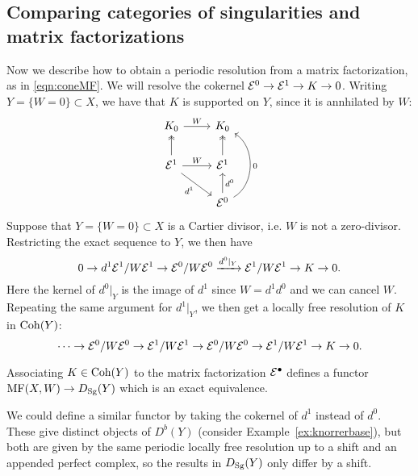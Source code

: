 \subsection{Comparing categories of singularities and matrix factorizations}

Now we describe how to obtain a periodic resolution from a matrix factorization,
as in \eqref{eqn:coneMF}. We will resolve the cokernel
$\mathcal{E}^0\to\mathcal{E}^1\to K\to0$. Writing $Y=\{W=0\}\subset X$, we have that $K$ is
supported on $Y$, since it is annhilated by $W$:
\begin{equation*}
    \begin{tikzcd}
        K_0 \ar[r,"W"] & K_0 \\
        \calE^1 \ar[r,"W"] \ar[dr,"d^1"'] \ar[u,two heads] &
        \calE^1 \ar[u,two heads] \\
        & \calE^0 \ar[u,"d^0"'] \ar[uu,bend right=60,"0"']
    \end{tikzcd}
\end{equation*}
Suppose that $Y=\{W=0\}\subset X$ is a Cartier divisor, i.e. $W$ is not a
zero-divisor. Restricting the exact sequence to $Y$, we then have
\begin{equation*}
    0 \to d^1\mathcal{E}^1/W\mathcal{E}^1
        \to \mathcal{E}^0/W\mathcal{E}^0 \xrightarrow{d^0|_Y} \mathcal{E}^1/W\mathcal{E}^1 \to K \to 0.
\end{equation*}
Here the kernel of $d^0|_Y$ is the image of $d^1$ since $W=d^1d^0$ and we can
cancel $W$. Repeating the same argument for $d^1|_Y$, we then get a locally free
resolution of $K$ in $\operatorname{Coh}(Y)$:
\begin{equation*}
    \cdots \to \mathcal{E}^0/W\mathcal{E}^0 \to \mathcal{E}^1/W\mathcal{E}^1
        \to \mathcal{E}^0/W\mathcal{E}^0 \to \mathcal{E}^1/W\mathcal{E}^1 \to K \to 0.
\end{equation*}

\begin{proposition}{}{}
    Associating $K\in\operatorname{Coh}(Y)$ to the matrix factorization $\mathcal{E}^\bullet$
    defines a functor $\mathrm{MF}(X,W)\to D_{\mathrm{Sg}}(Y)$ which is an exact equivalence.
\end{proposition}

\begin{remark}{}{}
    We could define a similar functor by taking the cokernel of $d^1$ instead of
    $d^0$. These give distinct objects of $D^b(Y)$ (consider
    Example~\ref{ex:knorrerbase}), but both are given by the same periodic
    locally free resolution up to a shift and an appended perfect complex, so
    the results in $D_{\mathrm{Sg}}(Y)$ only differ by a shift.
\end{remark}

